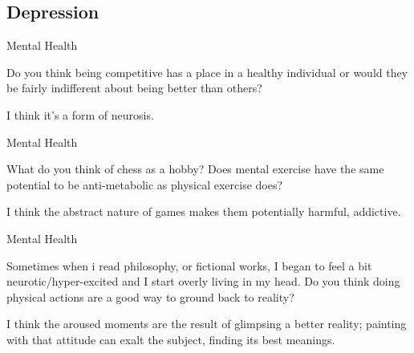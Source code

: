 \documentclass[11pt,oneside,openany,extrafontsizes]{memoir}
\begin{document}
\subsection{Depression}

\begin{qaexchange}{Mental Health}

    \begin{question}
        Do you think being competitive has a place in a healthy individual or would they be fairly indifferent about being better than others?
    \end{question}

    \begin{answer}
        I think it's a form of neurosis.
    \end{answer}
\end{qaexchange}

\begin{qaexchange}{Mental Health}

    \begin{question}
        What do you think of chess as a hobby? Does mental exercise have the same potential to be anti-metabolic as physical exercise does?
    \end{question}

    \begin{answer}
        I think the abstract nature of games makes them potentially harmful, addictive.
    \end{answer}
\end{qaexchange}

\begin{qaexchange}{Mental Health}

    \begin{question}
        Sometimes when i read philosophy, or fictional works, I began to feel a bit neurotic/hyper-excited and I start overly living in my head. Do you think doing physical actions are a good way to ground back to reality?
    \end{question}

    \begin{answer}
        I think the aroused moments are the result of glimpsing a better reality; painting with that attitude can exalt the subject, finding its best meanings.
    \end{answer}
\end{qaexchange}
\end{document}
